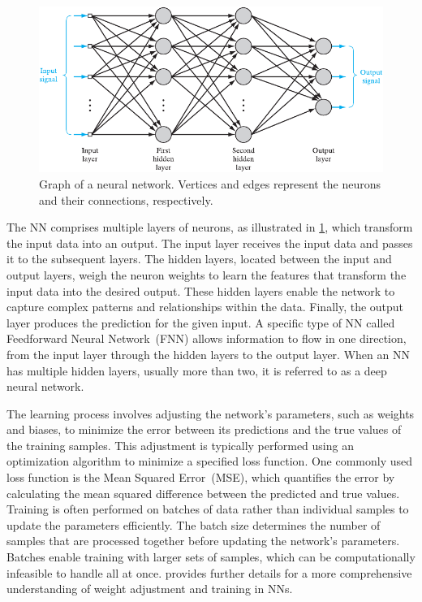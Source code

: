 \begin{figure}[ht]
    \caption[Graph of a neural network.]{Graph of a neural network. Vertices and edges represent the neurons and their connections, respectively.}
    \label{fig:neuralnetwork}
    \addmargin
    \centering
    \includegraphics[width=0.9\linewidth]{figures/network.pdf}
    \addmargin
\end{figure}

The NN comprises multiple layers of neurons, as illustrated in \cref{fig:neuralnetwork}, which transform the input data into an output. The input layer receives the input data and passes it to the subsequent layers. The hidden layers, located between the input and output layers, weigh the neuron weights to learn the features that transform the input data into the desired output. These hidden layers enable the network to capture complex patterns and relationships within the data. Finally, the output layer produces the prediction for the given input. A specific type of NN called Feedforward Neural Network~(FNN) allows information to flow in one direction, from the input layer through the hidden layers to the output layer. When an NN has multiple hidden layers, usually more than two, it is referred to as a deep neural network.

The learning process involves adjusting the network's parameters, such as weights and biases, to minimize the error between its predictions and the true values of the training samples. This adjustment is typically performed using an optimization algorithm to minimize a specified loss function. One commonly used loss function is the Mean Squared Error~(MSE), which quantifies the error by calculating the mean squared difference between the predicted and true values. Training is often performed on batches of data rather than individual samples to update the parameters efficiently. The batch size determines the number of samples that are processed together before updating the network's parameters. Batches enable training with larger sets of samples, which can be computationally infeasible to handle all at once. \citet{haykin2009neural} provides further details for a more comprehensive understanding of weight adjustment and training in NNs.

